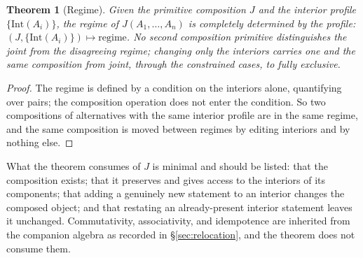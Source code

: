 \documentclass[11pt]{article}
\newtheorem{theorem}{Theorem}
\begin{document}
\begin{theorem}[Regime]\label{thm:regime}
Given the primitive composition $J$ and the interior profile $\{\mathrm{Int}(A_i)\}$, the regime of $J(A_1, \ldots, A_n)$ is completely determined by the profile: $(J, \{\mathrm{Int}(A_i)\}) \mapsto \text{regime}$. No second composition primitive distinguishes the joint from the disagreeing regime; changing only the interiors carries one and the same composition from joint, through the constrained cases, to fully exclusive.
\end{theorem}
\begin{proof}
The regime is defined by a condition on the interiors alone, quantifying over pairs; the composition operation does not enter the condition. So two compositions of alternatives with the same interior profile are in the same regime, and the same composition is moved between regimes by editing interiors and by nothing else.
\end{proof}

\noindent What the theorem consumes of $J$ is minimal and should be listed: that the composition exists; that it preserves and gives access to the interiors of its components; that adding a genuinely new statement to an interior changes the composed object; and that restating an already-present interior statement leaves it unchanged. Commutativity, associativity, and idempotence are inherited from the companion algebra as recorded in \S\ref{sec:relocation}, and the theorem does not consume them.
\end{document}

